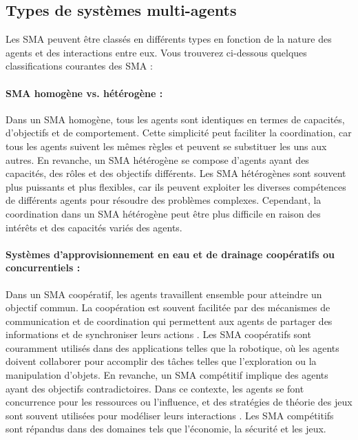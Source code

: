 \subsection{Types de systèmes multi-agents}

Les SMA peuvent être classés en différents types en fonction de la nature des agents et des interactions entre eux. Vous trouverez ci-dessous quelques classifications courantes des SMA :

\paragraph{SMA homogène vs. hétérogène :}
Dans un SMA homogène, tous les agents sont identiques en termes de capacités, d'objectifs et de comportement. Cette simplicité peut faciliter la coordination, car tous les agents suivent les mêmes règles et peuvent se substituer les uns aux autres. En revanche, un SMA hétérogène se compose d'agents ayant des capacités, des rôles et des objectifs différents. Les SMA hétérogènes sont souvent plus puissants et plus flexibles, car ils peuvent exploiter les diverses compétences de différents agents pour résoudre des problèmes complexes. Cependant, la coordination dans un SMA hétérogène peut être plus difficile en raison des intérêts et des capacités variés des agents.

\paragraph{Systèmes d'approvisionnement en eau et de drainage coopératifs ou concurrentiels :}
Dans un SMA coopératif, les agents travaillent ensemble pour atteindre un objectif commun. La coopération est souvent facilitée par des mécanismes de communication et de coordination qui permettent aux agents de partager des informations et de synchroniser leurs actions \cite{falco2020tendencies}. Les SMA coopératifs sont couramment utilisés dans des applications telles que la robotique, où les agents doivent collaborer pour accomplir des tâches telles que l'exploration ou la manipulation d'objets. En revanche, un SMA compétitif implique des agents ayant des objectifs contradictoires. Dans ce contexte, les agents se font concurrence pour les ressources ou l'influence, et des stratégies de théorie des jeux sont souvent utilisées pour modéliser leurs interactions \cite{shoham2008multiagent}. Les SMA compétitifs sont répandus dans des domaines tels que l'économie, la sécurité et les jeux.

